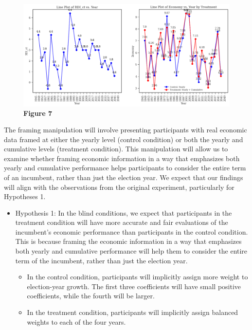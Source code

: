 \documentclass[
]{article}
\providecommand{\tightlist}{%
  \setlength{\itemsep}{0pt}\setlength{\parskip}{0pt}}
\begin{document}
\begin{figure}
\centering
\includegraphics{difcum2.png}
\caption{\textbf{Figure 7}}
\end{figure}

The framing manipulation will involve presenting participants with real
economic data framed at either the yearly level (control condition) or
both the yearly and cumulative levels (treatment condition). This
manipulation will allow us to examine whether framing economic
information in a way that emphasizes both yearly and cumulative
performance helps participants to consider the entire term of an
incumbent, rather than just the election year. We expect that our
findings will align with the observations from the original experiment,
particularly for Hypotheses 1.

\begin{itemize}
\tightlist
\item
  Hypothesis 1: In the blind conditions, we expect that participants in
  the treatment condition will have more accurate and fair evaluations
  of the incumbent's economic performance than participants in the
  control condition. This is because framing the economic information in
  a way that emphasizes both yearly and cumulative performance will help
  them to consider the entire term of the incumbent, rather than just
  the election year.

  \begin{itemize}
  \tightlist
  \item
    In the control condition, participants will implicitly assign more
    weight to election-year growth. The first three coefficients will
    have small positive coefficients, while the fourth will be larger.
  \item
    In the treatment condition, participants will implicitly assign
    balanced weights to each of the four years.
  \end{itemize}
\end{itemize}
\end{document}
